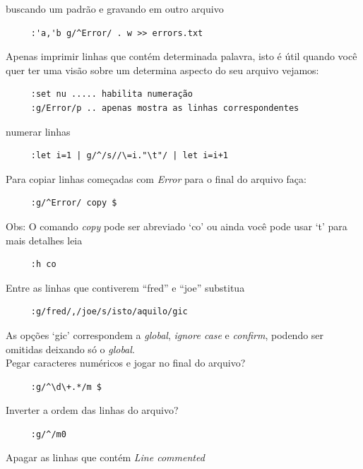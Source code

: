\documentclass[10pt,a4paper,openany]{book}
\begin{document}
buscando um padrão e gravando em outro arquivo

\begin{verbatim}
     :'a,'b g/^Error/ . w >> errors.txt
\end{verbatim}

Apenas imprimir linhas que contém determinada palavra, isto é útil 
quando você quer ter uma visão sobre um determina aspecto 
do seu arquivo vejamos:

\begin{verbatim}
     :set nu ..... habilita numeração 
     :g/Error/p .. apenas mostra as linhas correspondentes
\end{verbatim}

numerar linhas

\begin{verbatim}
     :let i=1 | g/^/s//\=i."\t"/ | let i=i+1
\end{verbatim}

Para copiar linhas começadas com {\em Error} para o final do arquivo faça:

\begin{verbatim}
     :g/^Error/ copy $
\end{verbatim}

Obs: O comando {\em copy} pode ser abreviado `co' ou ainda você pode usar `t'
para mais detalhes leia

\begin{verbatim}
     :h co
\end{verbatim}

Entre as linhas que contiverem ``fred'' e ``joe'' substitua

\begin{verbatim}
     :g/fred/,/joe/s/isto/aquilo/gic
\end{verbatim}

As opções `gic' correspondem a {\em global}, {\em ignore case} e {\em
confirm}, podendo ser omitidas deixando só o {\em global}. \\


Pegar caracteres numéricos e jogar no final do arquivo?

\begin{verbatim}
     :g/^\d\+.*/m $
\end{verbatim}

Inverter a ordem das linhas do arquivo?

\begin{verbatim}
     :g/^/m0
\end{verbatim}

Apagar as linhas que contém {\em Line commented}
\end{document}
